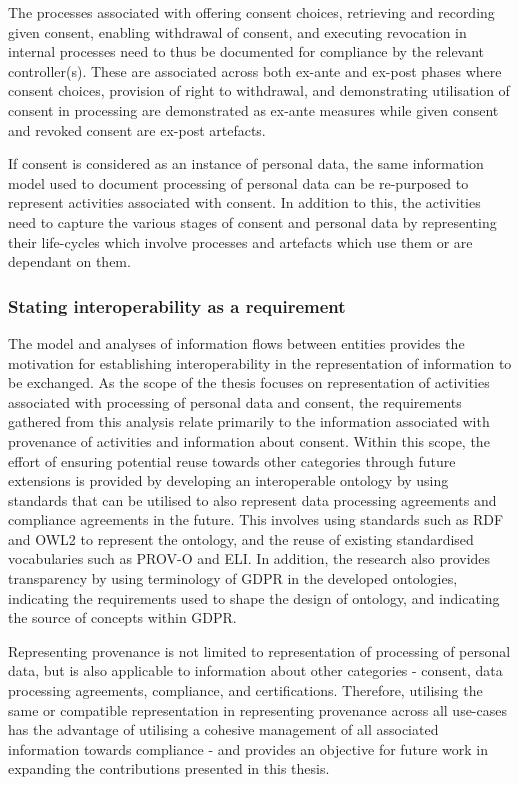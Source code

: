The processes associated with offering consent choices, retrieving and recording given consent, enabling withdrawal of consent, and executing revocation in internal processes need to thus be documented for compliance by the relevant controller(s).
These are associated across both ex-ante and ex-post phases where consent choices, provision of right to withdrawal, and demonstrating utilisation of consent in processing are demonstrated as ex-ante measures while given consent and revoked consent are ex-post artefacts. 

If consent is considered as an instance of personal data, the same information model used to document processing of personal data can be re-purposed to represent activities associated with consent. In addition to this, the activities need to capture the various stages of consent and personal data by representing their life-cycles which involve processes and artefacts which use them or are dependant on them. 

\subsubsection*{Stating interoperability as a requirement}
The model and analyses of information flows between entities provides the motivation for establishing interoperability in the representation of information to be exchanged.
As the scope of the thesis focuses on representation of activities associated with processing of personal data and consent, the requirements gathered from this analysis relate primarily to the information associated with provenance of activities and information about consent.
Within this scope, the effort of ensuring potential reuse towards other categories through future extensions is provided by developing an interoperable ontology by using standards that can be utilised to also represent data processing agreements and compliance agreements in the future.
This involves using standards such as RDF and OWL2 to represent the ontology, and the reuse of existing standardised vocabularies such as PROV-O and ELI.
In addition, the research also provides transparency by using terminology of GDPR in the developed ontologies, indicating the requirements used to shape the design of ontology, and indicating the source of concepts within GDPR.

Representing provenance is not limited to representation of processing of personal data, but is also applicable to information about other categories - consent, data processing agreements, compliance, and certifications. Therefore, utilising the same or compatible representation in representing provenance across all use-cases has the advantage of utilising a cohesive management of all associated information towards compliance - and provides an objective for future work in expanding the contributions presented in this thesis.

